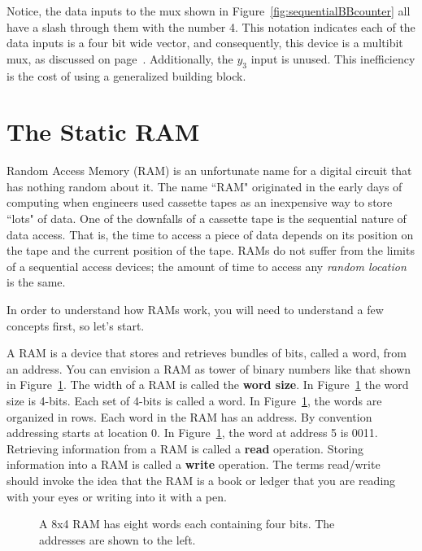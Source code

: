 Notice, the data inputs to the mux shown in Figure~\ref{fig:sequentialBBcounter}
all have a slash through them with
the number 4.  This notation indicates each of the data inputs is a four
bit wide
vector, and consequently, this device is a multibit mux, as discussed on
page~\pageref{page:wmu}.  Additionally, the $y_3$ input is unused.  This
inefficiency is the cost of using a generalized building block.


\section{The Static RAM}
Random Access Memory (RAM) is an unfortunate name for a digital circuit
that has nothing random about it.  The name ``RAM" originated in the early
days of computing when engineers used cassette tapes as an inexpensive way
to store ``lots" of data.  One of the downfalls of a cassette tape is the
sequential nature of data access.  That is, the time to access a piece of
data depends on its position on the tape and the current position of the
tape.  RAMs do not suffer from the limits of a sequential access devices; the
amount of time to access any \textit{ random location} is the same.

In order to understand how RAMs work, you will need to understand a few
concepts first, so let's start.

A RAM is a device that stores and retrieves bundles of bits, called
a word, from an address.  You can envision a RAM as tower
of binary numbers like that shown in Figure~\ref{fig:sequentialBBram}.
The width of a RAM is called the \textbf{word size}.  In Figure~\ref{fig:sequentialBBram}
the word size is 4-bits.  Each set of 4-bits is called a word.  In
Figure~\ref{fig:sequentialBBram}, the words are organized in rows.
Each word in the RAM has an address. By convention addressing
starts at location 0.  In Figure~\ref{fig:sequentialBBram}, the word at
address 5 is 0011.  Retrieving information from a RAM is called a
\textbf{read} operation.  Storing information into a RAM is called a \textbf{write}
operation.  The terms read/write should invoke the idea that the RAM is a
book or ledger that you are reading with your eyes or writing into it with a pen.

\begin{figure}[ht]
\caption{A 8x4 RAM has eight words each containing four bits.  The addresses
are shown to the left.}
\label{fig:sequentialBBram}
\end{figure}

